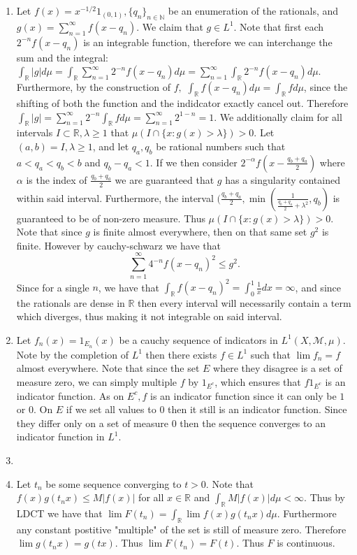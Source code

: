 \documentclass[12pt, letterpaper]{article}
\newcommand{\N}{\mathbb{N}}
\newcommand{\R}{\mathbb{R}}
\begin{document}
\begin{enumerate}
	\item[8] Let $f(x) = x^{-1/2}1_{(0,1)}, \{q_n\}_{n \in \N}$ be an enumeration of the rationals, and 
	$g(x) = \sum_{n=1}^\infty f(x - q_n)$.  We claim that $g \in L^1$.  Note that first each $2^{-n}f(x - q_n)$ is an 
	integrable function, therefore we can interchange the  sum and the integral:
	$\int_\R |g| d \mu = \int_\R \sum_{n=1}^\infty 2^{-n} f(x-q_n) d\mu = \sum_{n=1}^\infty \int_\R 2^{-n}f(x-q_n) d\mu$.
	Furthermore, by the construction of $f,$ $\int_\R f(x-q_n) d \mu = \int_\R f d \mu$, since the shifting of both the function and the indidcator exactly cancel out.  Therefore $\int_\R |g| = \sum_{n=1}^\infty 2^{-n}\int_\R f d \mu = 
	\sum_{n=1}^\infty 2^{1-n} = 1$.  We additionally claim for all intervals $I \subset \R, \lambda \geq 1$ that
	$\mu(I \cap \{x: g(x) > \lambda\}) > 0$.   Let $(a,b) = I, \lambda \geq 1$, and let $q_a, q_b$ be rational numbers such that 
	$a < q_a < q_b < b$  and $q_b - q_a < 1$.  If we then consider $2^{-\alpha}f(x - \frac{q_b + q_a}{2})$ where 
	$\alpha$ is the index of $\frac{q_b + q_a}{2}$ we are guaranteed that $g$ has a singularity contained within said 
	interval.  Furthermore, the interval $(\frac{q_b + q_a}{2}, \min(\frac{1}{\frac{q_b + q_a}{2} +\lambda^2}, q_b)$ is
	guaranteed to be of non-zero measure.  Thus $\mu(I \cap \{x: g(x) > \lambda\}) > 0$.  Note that since $g$ is finite
	almost everywhere, then on that same set $g^2$ is finite.  However by cauchy-schwarz we have that 
	$$
     \sum_{n=1}^\infty 4^{-n}f(x-q_n)^2  \leq g^2.
	$$
	Since for a single $n$, we have that $\int_\R f(x - q_n)^2 = \int_0^1 \frac{1}{x} dx = \infty$, and since the rationals are dense in $\R$ then every interval will necessarily contain a term which diverges, thus making it not integrable on said interval.
	\item[9] Let $f_n(x) = 1_{E_n}(x)$ be a cauchy sequence of indicators in $L^1(X,\mathcal M, \mu)$.  Note by the completion of 
	$L^1$ then there exists $f \in L^1$ such that $\lim f_n = f$ almost everywhere.  Note that since the set $E$ where they 
	disagree is a set of measure zero, we can simply multiple $f$ by $1_{E^c}$, which ensures that $f 1_{E^c}$  is an 
	indicator function.  As on $E^c, f$ is an indicator function since it can only be $1$ or $0$.  On $E$ if we set 
	all values to $0$ then it still is an indicator function.  Since they differ only on a set of measure 0 then the 
	sequence converges to an indicator function in $L^1$.
	\item[10]
	\item[11] Let $t_n$ be some sequence converging to $t > 0$. Note that $f(x)g(t_n x) \leq M|f(x)|$ for all $x \in \R$ and $\int_\R M |f(x)|d \mu < \infty$.  Thus by LDCT we have that $\lim F(t_n) = \int_\R \lim f(x) g(t_n x) d\mu$.  
	Furthermore any constant postitive "multiple" of the set is still of measure zero.  Therefore $\lim g(t_nx) = g(tx)$.
	Thus $\lim F(t_n) = F(t)$.  Thus $F$ is continuous.
	 

\end{enumerate}
\end{document}
